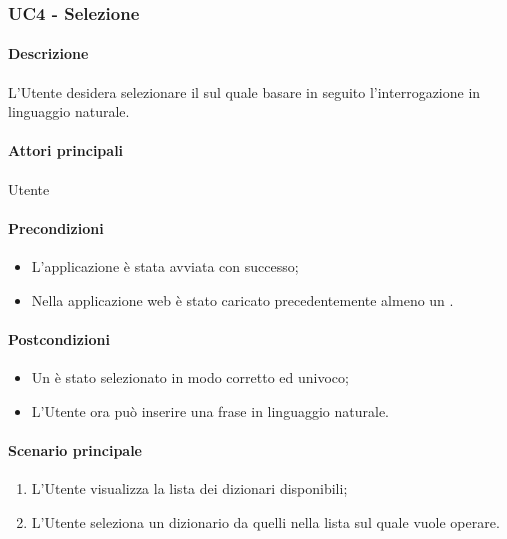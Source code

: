 \subsubsection{UC4 - Selezione }\label{UC4}
\paragraph*{Descrizione}
L’Utente desidera selezionare il  sul quale basare in seguito l’interrogazione in linguaggio naturale.

\paragraph*{Attori principali}
Utente

\paragraph*{Precondizioni}
\begin{itemize}
  \item L'applicazione è stata avviata con successo;
  \item Nella applicazione web è stato caricato precedentemente almeno un .
\end{itemize}

\paragraph*{Postcondizioni}
\begin{itemize}
  \item Un  è stato selezionato in modo corretto ed univoco;
  \item L’Utente ora può inserire una frase in linguaggio naturale.
\end{itemize}

\paragraph*{Scenario principale}
\begin{enumerate}
  \item L’Utente visualizza la lista dei dizionari disponibili;
  \item L’Utente seleziona un dizionario da quelli nella lista sul quale vuole operare.
\end{enumerate}
